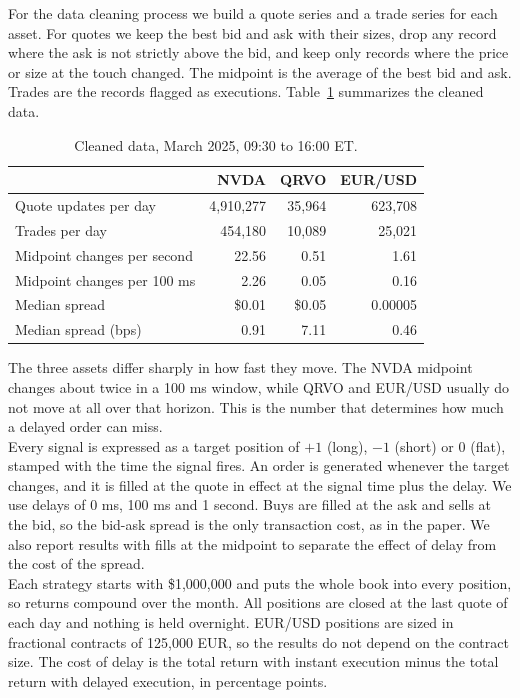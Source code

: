 \documentclass{article}
\begin{document}
\noindent For the data cleaning process we build a quote series and a trade series for each asset. For quotes we keep the best bid and ask with their sizes, drop any record where the ask is not strictly above the bid, and keep only records where the price or size at the touch changed. The midpoint is the average of the best bid and ask. Trades are the records flagged as executions. Table~\ref{tab:data} summarizes the cleaned data.

\begin{table}[h]
\centering
\begin{tabular}{lrrr}
\hline
 & NVDA & QRVO & EUR/USD \\
\hline
Quote updates per day & 4,910,277 & 35,964 & 623,708 \\
Trades per day & 454,180 & 10,089 & 25,021 \\
Midpoint changes per second & 22.56 & 0.51 & 1.61 \\
Midpoint changes per 100 ms & 2.26 & 0.05 & 0.16 \\
Median spread & \$0.01 & \$0.05 & 0.00005 \\
Median spread (bps) & 0.91 & 7.11 & 0.46 \\
\hline
\end{tabular}
\caption{Cleaned data, March 2025, 09:30 to 16:00 ET.}
\label{tab:data}
\end{table}

\noindent The three assets differ sharply in how fast they move. The NVDA midpoint changes about twice in a 100 ms window, while QRVO and EUR/USD usually do not move at all over that horizon. This is the number that determines how much a delayed order can miss. \\

\noindent Every signal is expressed as a target position of $+1$ (long), $-1$ (short) or $0$ (flat), stamped with the time the signal fires. An order is generated whenever the target changes, and it is filled at the quote in effect at the signal time plus the delay. We use delays of 0 ms, 100 ms and 1 second. Buys are filled at the ask and sells at the bid, so the bid-ask spread is the only transaction cost, as in the paper. We also report results with fills at the midpoint to separate the effect of delay from the cost of the spread. \\

\noindent Each strategy starts with \$1,000,000 and puts the whole book into every position, so returns compound over the month. All positions are closed at the last quote of each day and nothing is held overnight. EUR/USD positions are sized in fractional contracts of 125,000 EUR, so the results do not depend on the contract size. The cost of delay is the total return with instant execution minus the total return with delayed execution, in percentage points.\\
\end{document}

